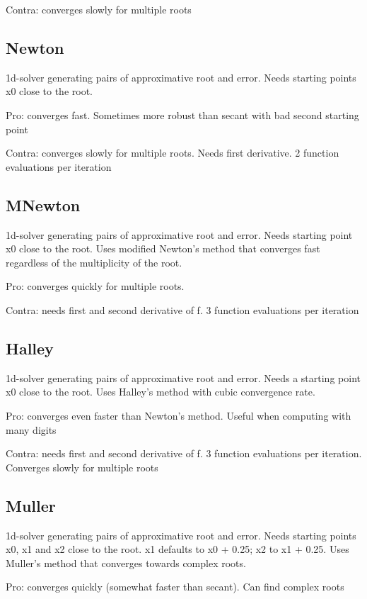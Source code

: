 Contra:  converges slowly for multiple roots


\subsection{Newton}
1d-solver generating pairs of approximative root and error.
Needs starting points x0 close to the root.

Pro: converges fast. Sometimes more robust than secant with bad second starting point

Contra:  converges slowly for multiple roots. Needs first derivative.
 2 function evaluations per iteration


\subsection{MNewton}
1d-solver generating pairs of approximative root and error.
Needs starting point x0 close to the root. Uses modified Newton's method that converges fast regardless of the multiplicity of the root.

Pro: converges quickly for multiple roots.

Contra:  needs first and second derivative of f. 3 function evaluations per iteration



\subsection{Halley}
1d-solver generating pairs of approximative root and error. Needs a starting point x0 close to the root. Uses Halley's method with cubic
convergence rate.

Pro: converges even faster than Newton's method. Useful when computing with many digits

Contra:  needs first and second derivative of f. 3 function evaluations per iteration. Converges slowly for multiple roots




\subsection{Muller}
1d-solver generating pairs of approximative root and error.
Needs starting points x0, x1 and x2 close to the root. x1 defaults to x0 + 0.25; x2 to x1 + 0.25. Uses Muller's method that converges towards complex roots.

Pro: converges quickly (somewhat faster than secant). Can find complex roots

